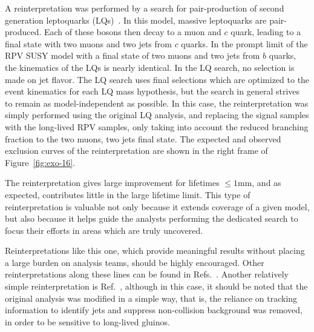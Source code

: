 A reinterpretation was performed by a search for pair-production of second
generation leptoquarks (LQs)~\cite{CMS-PAS-EXO-16-007,Sirunyan:2018ryt}. In this model, massive
leptoquarks are pair-produced.  Each of these bosons then decay to a muon and
$c$ quark, leading to a final state with two muons and two jets from $c$ quarks.
In the prompt limit of the RPV SUSY model with a final state of two muons and
two jets from $b$ quarks, the kinematics of the LQs is nearly identical. In the
LQ search, no selection is made on jet flavor. The LQ search uses final
selections which are optimized to the event kinematics for each LQ mass
hypothesis, but the search in general strives to remain as model-independent as
possible. In this case, the reinterpretation was simply performed using the
original LQ analysis, and replacing the signal samples with the long-lived RPV
samples, only taking into account the reduced branching fraction to the two
muons, two jets final state. The expected and observed exclusion curves of the
reinterpretation are shown in the right frame of Figure~\ref{fig:exo-16}.

The reinterpretation gives large improvement for lifetimes $\leq1$mm, and as
expected, contributes little in the large lifetime limit. This type of
reinterpretation is valuable not only because it extends coverage of a given
model, but also because it helps guide the analysts performing the dedicated
search to focus their efforts in areas which are truly uncovered.

Reinterpretations like this one, which provide meaningful results without
placing a large burden on analysis teams, should be highly encouraged. Other reinterpretations along
these lines can be found in Refs.~\cite{ATLAS-CONF-2014-037,Sirunyan:2018vjp,Aaboud:2018iil}. Another relatively simple
reinterpretation is Ref.~\cite{ATLAS-CONF-2018-003}, although in this case, it
should be noted that the original analysis was modified in a simple way, that is,
the reliance on tracking information to identify jets and suppress non-collision background was
removed, in order to be sensitive to long-lived gluinos.


